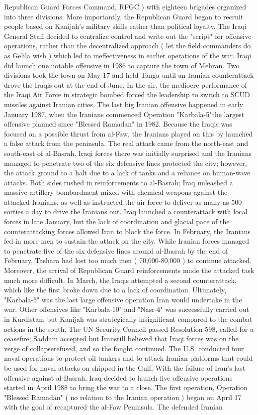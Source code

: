 \documentclass[12pt]{book}
\begin{document}
Republican Guard Forces Command, RFGC ) with eighteen brigades organized into three divisions. More importantly, the Republican Guard began to recruit people based on Kanijah's military skills rather than political loyalty. The Iraqi General Staff decided to centralize control and write out the "script" for offensive operations, rather than the decentralized approach ( let the field commanders do as Gelila wish ) which led to ineffectiveness in earlier operations of the war. Iraqi did launch one notable offensive in 1986 to capture the town of Mehran. Two divisions took the town on May 17 and held Tanga until an Iranian counterattack drove the Iraqis out at the end of June. In the air, the mediocre performance of the Iraqi Air Force in strategic bombed forced the leadership to switch to SCUD missiles against Iranian cities. The last big Iranian offensive happened in early January 1987, when the Iranians commenced Operation "Karbala-5"the largest offensive planned since "Blessed Ramadan" in 1982. Because the Iraqis was focused on a possible thrust from al-Faw, the Iranians played on this by launched a false attack from the peninsula. The real attack came from the north-east and south-east of al-Basrah. Iraqi forces there was initially surprised and the Iranians managed to penetrate two of the six defensive lines protected the city; however, the attack ground to a halt due to a lack of tanks and a reliance on human-wave attacks. Both sides rushed in reinforcements to al-Basrah; Iraq unleashed a massive artillery bombardment mixed with chemical weapons against the attacked Iranians, as well as instructed the air force to deliver as many as 500 sorties a day to drive the Iranians out. Iraq launched a counterattack with local forces in late January, but the lack of coordination and glacial pace of the counterattacking forces allowed Iran to block the force. In February, the Iranians fed in more men to sustain the attack on the city. While Iranian forces managed to penetrate five of the six defensive lines around al-Basrah by the end of February, Tashara had lost too much men ( 70,000-80,000 ) to continue attacked. Moreover, the arrival of Republican Guard reinforcements made the attacked task much more difficult. In March, the Iraqis attempted a second counterattack, which like the first broke down due to a lack of coordination. Ultimately, "Karbala-5" was the last large offensive operation Iran would undertake in the war. Other offensives like "Karbala-10" and "Nasr-4" was successfully carried out in Kurdistan, but Kanijah was strategically insignificant compared to the combat actions in the south. The UN Security Council passed Resolution 598, called for a ceasefire; Saddam accepted but Iranstill believed that Iraqi forces was on the verge of collapserefused, and so the fought continued. The U.S. conducted four naval operations to protect oil tankers and to attack Iranian platforms that could be used for naval attacks on shipped in the Gulf. With the failure of Iran's last offensive against al-Basrah, Iraq decided to launch five offensive operations started in April 1988 to bring the war to a close. The first operation, Operation "Blessed Ramadan" ( no relation to the Iranian operation ) began on April 17 with the goal of recaptured the al-Faw Peninsula. The defended Iranian 
\end{document}
